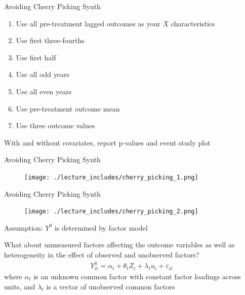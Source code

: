 \documentclass{beamer}
\begin{document}
\begin{frame}{Avoiding Cherry Picking Synth}

\begin{enumerate}
\item Use all pre-treatment lagged outcomes as your $X$ characteristics
\item Use first three-fourths
\item Use first half
\item Use all odd years
\item Use all even years
\item Use pre-treatment outcome mean
\item Use three outcome values
\end{enumerate}

\bigskip

With and without covariates, report p-values and event study plot

\end{frame}

\begin{frame}{Avoiding Cherry Picking Synth}

	\begin{figure}
	\texttt{[image: ./lecture\_includes/cherry\_picking\_1.png]}
	\end{figure}

\end{frame}

\begin{frame}{Avoiding Cherry Picking Synth}

	\begin{figure}
	\texttt{[image: ./lecture\_includes/cherry\_picking\_2.png]}
	\end{figure}

\end{frame}



\begin{frame}{Assumption: $Y^0$ is determined by factor model}

What about unmeasured factors affecting the outcome variables as well as heterogeneity in the effect of observed and unobserved factors?
\begin{eqnarray*}
Y_{it}^0 = \alpha_t + \theta_t Z_i + \lambda_t u_i + \varepsilon_{it}
\end{eqnarray*}where $\alpha_t$ is an unknown common factor with constant factor loadings across units, and $\lambda_t$ is a vector of unobserved common factors

\end{frame}
\end{document}
